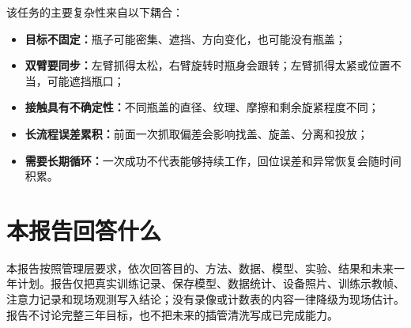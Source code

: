 该任务的主要复杂性来自以下耦合：

\begin{itemize}
  \item \textbf{目标不固定：}瓶子可能密集、遮挡、方向变化，也可能没有瓶盖；
  \item \textbf{双臂要同步：}左臂抓得太松，右臂旋转时瓶身会跟转；左臂抓得太紧或位置不当，可能遮挡瓶口；
  \item \textbf{接触具有不确定性：}不同瓶盖的直径、纹理、摩擦和剩余旋紧程度不同；
  \item \textbf{长流程误差累积：}前面一次抓取偏差会影响找盖、旋盖、分离和投放；
  \item \textbf{需要长期循环：}一次成功不代表能够持续工作，回位误差和异常恢复会随时间积累。
\end{itemize}

\section{本报告回答什么}

本报告按照管理层要求，依次回答目的、方法、数据、模型、实验、结果和未来一年计划。报告仅把真实训练记录、保存模型、数据统计、设备照片、训练示教帧、注意力记录和现场观测写入结论；没有录像或计数表的内容一律降级为现场估计。报告不讨论完整三年目标，也不把未来的插管清洗写成已完成能力。
